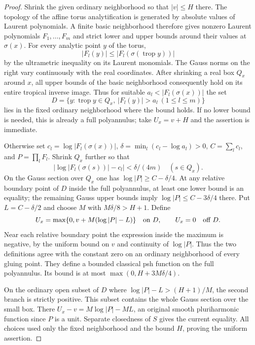 \documentclass[11pt,a4paper]{article}
\numberwithin{equation}{section}
\theoremstyle{definition}
\theoremstyle{remark}
\begin{document}
\begin{proof}
Shrink the given ordinary neighborhood so that $|v|\le H$ there.
The topology of the affine torus analytification is generated by
absolute values of Laurent polynomials. A finite basic neighborhood
therefore gives nonzero Laurent polynomials $F_1,\ldots,F_m$ and
strict lower and upper bounds around their values at $\sigma(x)$.
For every analytic point $y$ of the torus,
\[
                  |F_l(y)|\le|F_l(\sigma(\operatorname{trop}y))|
\]
by the ultrametric inequality on its Laurent monomials. The Gauss
norms on the right vary continuously with the real coordinates.
After shrinking a real box $Q_x$ around $x$, all upper bounds of
the basic neighborhood consequently hold on its entire tropical
inverse image. Thus for suitable $a_l<|F_l(\sigma(x))|$ the set
\[
 D=\{y:\operatorname{trop}y\in Q_x,\ |F_l(y)|>a_l\ (1\le l\le m)\}
\]
lies in the fixed ordinary neighborhood where the bound holds.
If no lower bound is needed, this is already a full polyannulus;
take $U_x=v+H$ and the assertion is immediate.

Otherwise set $c_l=\log|F_l(\sigma(x))|$,
$\delta=\min_l(c_l-\log a_l)>0$, $C=\sum_lc_l$, and
$P=\prod_lF_l$. Shrink $Q_x$ further so that
\[
 \big|\log|F_l(\sigma(s))|-c_l\big|<\delta/(4m)
                                                       \quad(s\in Q_x).
\]
On the Gauss section over $Q_x$ one has
$\log|P|\ge C-\delta/4$. At any relative boundary point of $D$
inside the full polyannulus, at least one lower bound is an equality;
the remaining Gauss upper bounds imply
$\log|P|\le C-3\delta/4$ there. Put $L=C-\delta/2$ and choose
$M$ with $M\delta/8>H+1$. Define
\[
 U_x=\max\{0,v+M(\log|P|-L)\}\quad\hbox{on }D,
                  \qquad U_x=0\quad\hbox{off }D.
\]
Near each relative boundary point the expression inside the maximum
is negative, by the uniform bound on $v$ and continuity of $\log|P|$.
Thus the two definitions agree with the constant zero on an ordinary
neighborhood of every gluing point. They define a bounded classical
psh function on the full polyannulus. Its bound is at most
$\max(0,H+3M\delta/4)$.

On the ordinary open subset of $D$ where
$\log|P|-L>(H+1)/M$, the second branch is strictly positive.
This subset contains the whole Gauss section over the small box.
There $U_x-v=M\log|P|-ML$, an original smooth pluriharmonic
function since $P$ is a unit. Separate closedness of $S$ gives
the current equality. All choices used only the fixed neighborhood
and the bound $H$, proving the uniform assertion.
\end{proof}
\end{document}
